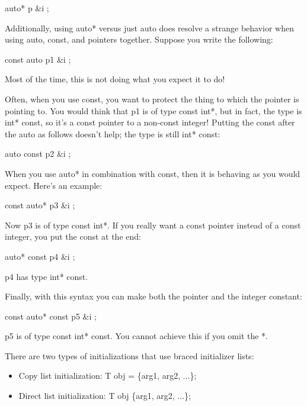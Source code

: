 \begin{cpp}
auto* p { &i };
\end{cpp}

Additionally, using auto* versus just auto does resolve a strange behavior when using auto, const, and pointers together. Suppose you write the following:

\begin{cpp}
const auto p1 { &i };
\end{cpp}

Most of the time, this is not doing what you expect it to do!

Often, when you use const, you want to protect the thing to which the pointer is pointing to. You would think that p1 is of type const int*, but in fact, the type is int* const, so it’s a const pointer to a non-const integer! Putting the const after the auto as follows doesn’t help; the type is still int* const:

\begin{cpp}
auto const p2 { &i };
\end{cpp}

When you use auto* in combination with const, then it is behaving as you would expect. Here’s an example:

\begin{cpp}
const auto* p3 { &i };
\end{cpp}

Now p3 is of type const int*. If you really want a const pointer instead of a const integer, you put the const at the end:

\begin{cpp}
auto* const p4 { &i };
\end{cpp}

p4 has type int* const.

Finally, with this syntax you can make both the pointer and the integer constant:

\begin{cpp}
const auto* const p5 { &i };
\end{cpp}

p5 is of type const int* const. You cannot achieve this if you omit the *.


There are two types of initializations that use braced initializer lists:

\begin{itemize}
\item
Copy list initialization: T obj = \{arg1, arg2, ...\};

\item
Direct list initialization: T obj \{arg1, arg2, ...\};
\end{itemize}


